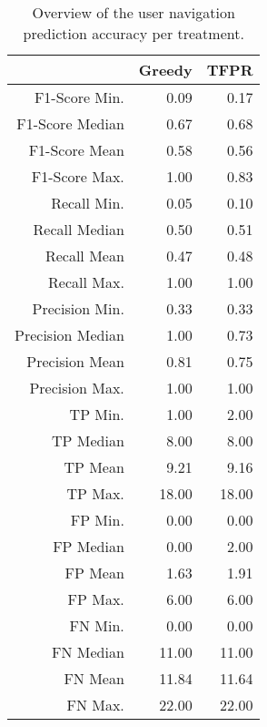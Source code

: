 \begin{table}[ht]
\centering
\begin{tabular}{rrr}
  \hline
 & Greedy & TFPR \\ 
  \hline
F1-Score Min. & 0.09 & 0.17 \\ 
  F1-Score Median & 0.67 & 0.68 \\ 
  F1-Score Mean & 0.58 & 0.56 \\ 
  F1-Score Max. & 1.00 & 0.83 \\ 
  Recall Min. & 0.05 & 0.10 \\ 
  Recall Median & 0.50 & 0.51 \\ 
  Recall Mean & 0.47 & 0.48 \\ 
  Recall Max. & 1.00 & 1.00 \\ 
  Precision Min. & 0.33 & 0.33 \\ 
  Precision Median & 1.00 & 0.73 \\ 
  Precision Mean & 0.81 & 0.75 \\ 
  Precision Max. & 1.00 & 1.00 \\ 
  TP Min. & 1.00 & 2.00 \\ 
  TP Median & 8.00 & 8.00 \\ 
  TP Mean & 9.21 & 9.16 \\ 
  TP Max. & 18.00 & 18.00 \\ 
  FP Min. & 0.00 & 0.00 \\ 
  FP Median & 0.00 & 2.00 \\ 
  FP Mean & 1.63 & 1.91 \\ 
  FP Max. & 6.00 & 6.00 \\ 
  FN Min. & 0.00 & 0.00 \\ 
  FN Median & 11.00 & 11.00 \\ 
  FN Mean & 11.84 & 11.64 \\ 
  FN Max. & 22.00 & 22.00 \\ 
   \hline
\end{tabular}
\caption{Overview of the user navigation prediction accuracy per treatment.} 
\label{tab:results:rq4:summary:treatment}
\end{table}
